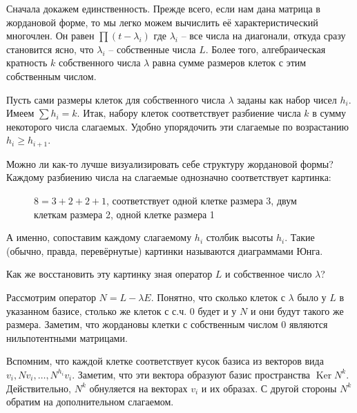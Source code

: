 \documentclass[10pt,a4paper,oneside]{book}
\theoremstyle{definition}
\renewcommand{\geq}{\geqslant}
\DeclareMathOperator{\Ker}{Ker}
\begin{document}
Сначала докажем единственность. Прежде всего, если нам дана матрица в жордановой форме, то мы легко можем вычислить её характеристический многочлен. Он равен $\prod (t-\lambda_i)$ где $\lambda_i$ -- все числа на диагонали, откуда сразу становится ясно, что $\lambda_i$ -- собственные числа $L$. Более того, алгебраическая кратность
$k$ собственного числа $\lambda$ равна сумме размеров клеток с этим собственным числом.

Пусть сами размеры клеток для собственного числа $\lambda$ заданы как набор чисел $h_i$. Имеем
$\sum h_i =k.$
Итак, набору клеток соответствует разбиение числа $k$ в сумму некоторого числа слагаемых. Удобно упорядочить эти слагаемые по возрастанию $h_i\geq h_{i+1}$.

Можно ли как-то лучше визуализировать себе структуру жордановой формы?
Каждому разбиению числа на слагаемые однозначно соответствует картинка:


\begin{figure}[hhh]
\begin{center}
\end{center}
\caption{$8=3+2+2+1$, соответствует одной клетке размера 3, двум клеткам размера 2, одной клетке размера 1}
\end{figure}

А именно, сопоставим каждому слагаемому $h_i$ столбик высоты $h_i$. Такие (обычно, правда, перевёрнутые) картинки называются диаграммами Юнга.

Как же восстановить эту картинку зная оператор $L$ и собственное число $\lambda$?

Рассмотрим оператор $N=L-\lambda E$. Понятно, что сколько клеток с $\lambda$ было у $L$ в указанном базисе, столько же клеток с с.ч. 0 будет и у $N$ и они будут такого же размера.
Заметим, что жордановы клетки с собственным числом 0 являются нильпотентными матрицами.



 Вспомним, что каждой клетке соответствует кусок базиса из векторов вида  $v_i, N v_i, \dots,N^{h_i} v_i$. Заметим, что эти вектора образуют базис пространства $\Ker N^k$. Действительно, $N^k$ обнуляется на векторах $v_i$ и их образах. С другой стороны $N^k$ обратим на дополнительном слагаемом.
\end{document}
